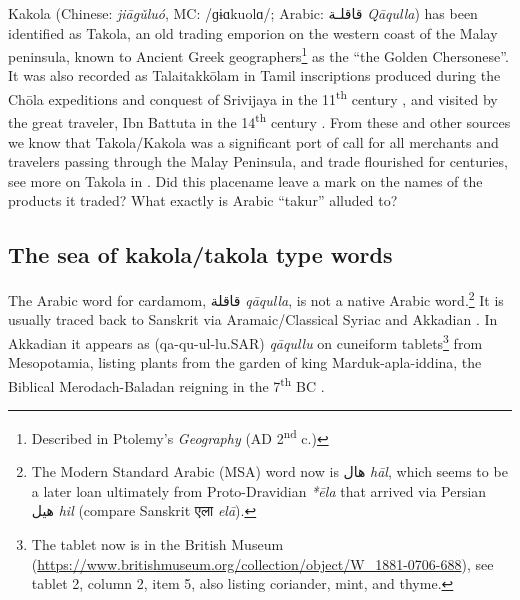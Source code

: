 \documentclass[12pt]{article}
\newcommand{\cu}[1]{\cuneiformfont{#1}\rmfamily}
\newcommand{\tc}[1]{\traditionalchinesefont{#1}\rmfamily}
\begin{document}
Kakola (Chinese: \tc{伽古羅} \textit{jiāgǔluó}, MC: /ɡɨɑkuolɑ/; Arabic: قاقلـة  \textit{Qāqulla}) has been identified as Takola, an old trading emporion on the western coast of the Malay peninsula, known to Ancient Greek geographers\footnote{Described in Ptolemy's \textit{Geography} (AD 2\textsuperscript{nd} c.)} as the ``the Golden Chersonese''. It was also recorded as Talaitakkōlam in Tamil inscriptions produced during the Chōla expeditions and conquest of Srivijaya in the 11\textsuperscript{th} century \parencite[270]{wheatley_1961_golden}, and visited by the great traveler, Ibn Battuta in the 14\textsuperscript{th} century \parencite{dunn_1986_adventures}. From these and other sources we know that Takola/Kakola was a significant port of call for all merchants and travelers passing through the Malay Peninsula, and trade flourished for centuries, see more on Takola in \textcite{jacq-hergoualch_2002_malay}. Did this placename leave a mark on the names of the products it traded? What exactly is Arabic ``takur'' \textcite{shi_2021_loanwords} alluded to?

\subsection{The sea of kakola/takola type words}

The Arabic word for cardamom, قاقلة \textit{qāqulla}, is not a native Arabic word.\footnote{The Modern Standard Arabic (MSA) word now is هال \textit{hāl}, which seems to be a later loan ultimately from Proto-Dravidian \textit{*ēla} \cite{burrow_1984_dravidian} that arrived via Persian هیل \textit{hil} (compare Sanskrit एला \textit{elā}).} It is usually traced back to Sanskrit via Aramaic/Classical Syriac and Akkadian \parencites[489]{loew_1928_flora}[58]{zimmern_1915_akkadische}. In Akkadian it appears as \cu{𒋡𒄣𒌌𒇻𒊬} (qa-qu-ul-lu.SAR) \textit{qāqullu} on cuneiform tablets\footnote{The tablet now is in the British Museum (\url{https://www.britishmuseum.org/collection/object/W_1881-0706-688}), see tablet 2, column 2, item 5, also listing coriander, mint, and thyme.} from Mesopotamia, listing plants from the garden of king Marduk-apla-iddina, the Biblical Merodach-Baladan reigning in the 7\textsuperscript{th} BC \parencite{ridder_2019_botanical}.


\end{document}
